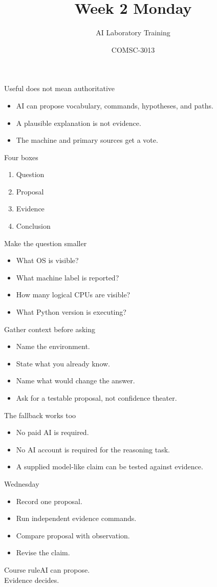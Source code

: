 \documentclass{beamer}
\title{Week 2 Monday}\subtitle{AI Laboratory Training}\author{COMSC-3013}\date{}
\begin{document}
\begin{frame}\titlepage\end{frame}
\begin{frame}{Useful does not mean authoritative}\begin{itemize}\item AI can propose vocabulary, commands, hypotheses, and paths.\item A plausible explanation is not evidence.\item The machine and primary sources get a vote.\end{itemize}\end{frame}
\begin{frame}{Four boxes}\begin{enumerate}\item Question\item Proposal\item Evidence\item Conclusion\end{enumerate}\end{frame}
\begin{frame}{Make the question smaller}\begin{itemize}\item What OS is visible?\item What machine label is reported?\item How many logical CPUs are visible?\item What Python version is executing?\end{itemize}\end{frame}
\begin{frame}{Gather context before asking}\begin{itemize}\item Name the environment.\item State what you already know.\item Name what would change the answer.\item Ask for a testable proposal, not confidence theater.\end{itemize}\end{frame}
\begin{frame}{The fallback works too}\begin{itemize}\item No paid AI is required.\item No AI account is required for the reasoning task.\item A supplied model-like claim can be tested against evidence.\end{itemize}\end{frame}
\begin{frame}{Wednesday}\begin{itemize}\item Record one proposal.\item Run independent evidence commands.\item Compare proposal with observation.\item Revise the claim.\end{itemize}\end{frame}
\begin{frame}{Course rule}\centering\Large AI can propose.\\[1em]Evidence decides.\end{frame}
\end{document}
